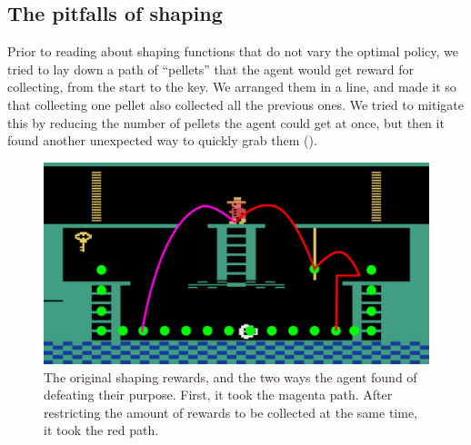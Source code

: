 
\subsection{The pitfalls of shaping\label{subsec:evaluation-shaping}}
Prior to reading about shaping functions that do not vary the optimal policy, we
tried to lay down a path of ``pellets'' that the agent would get reward for
collecting, from the start to the key. We arranged them in a line, and made it
so that collecting one pellet also collected all the previous ones. We tried to
mitigate this by reducing the number of pellets the agent could get at once, but
then it found another unexpected way to quickly grab them
().

\begin{figure}[hbtp]
\begin{center}
\includegraphics[width=\textwidth / 5 * 3]{img/shaping-defeated.pdf}
\end{center}
\caption{The original shaping rewards, and the two ways the agent found of
  defeating their purpose. First, it took the magenta path. After restricting
  the amount of rewards to be collected at the same time, it took the red
path.\label{fig:shaping-pitfalls}}
\end{figure}

